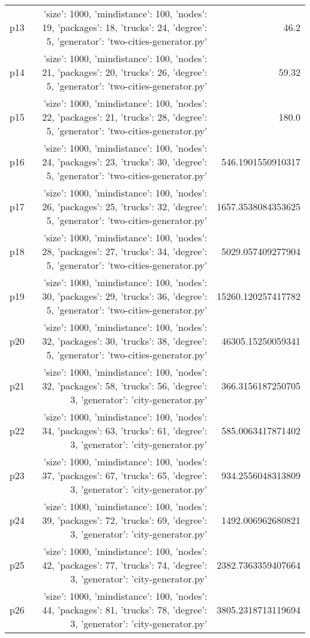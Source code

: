 \documentclass{article}
\begin{document}
\begin{center}
\begin{tabular}{r|r|r}
  p13&{'size': 1000, 'mindistance': 100, 'nodes': 19, 'packages': 18, 'trucks': 24, 'degree': 5, 'generator': 'two-cities-generator.py'}&46.2\\
  p14&{'size': 1000, 'mindistance': 100, 'nodes': 21, 'packages': 20, 'trucks': 26, 'degree': 5, 'generator': 'two-cities-generator.py'}&59.32\\
  p15&{'size': 1000, 'mindistance': 100, 'nodes': 22, 'packages': 21, 'trucks': 28, 'degree': 5, 'generator': 'two-cities-generator.py'}&180.0\\
  p16&{'size': 1000, 'mindistance': 100, 'nodes': 24, 'packages': 23, 'trucks': 30, 'degree': 5, 'generator': 'two-cities-generator.py'}&546.1901550910317\\
  p17&{'size': 1000, 'mindistance': 100, 'nodes': 26, 'packages': 25, 'trucks': 32, 'degree': 5, 'generator': 'two-cities-generator.py'}&1657.3538084353625\\
  p18&{'size': 1000, 'mindistance': 100, 'nodes': 28, 'packages': 27, 'trucks': 34, 'degree': 5, 'generator': 'two-cities-generator.py'}&5029.057409277904\\
  p19&{'size': 1000, 'mindistance': 100, 'nodes': 30, 'packages': 29, 'trucks': 36, 'degree': 5, 'generator': 'two-cities-generator.py'}&15260.120257417782\\
  p20&{'size': 1000, 'mindistance': 100, 'nodes': 32, 'packages': 30, 'trucks': 38, 'degree': 5, 'generator': 'two-cities-generator.py'}&46305.15250059341\\
  p21&{'size': 1000, 'mindistance': 100, 'nodes': 32, 'packages': 58, 'trucks': 56, 'degree': 3, 'generator': 'city-generator.py'}&366.3156187250705\\
  p22&{'size': 1000, 'mindistance': 100, 'nodes': 34, 'packages': 63, 'trucks': 61, 'degree': 3, 'generator': 'city-generator.py'}&585.0063417871402\\
  p23&{'size': 1000, 'mindistance': 100, 'nodes': 37, 'packages': 67, 'trucks': 65, 'degree': 3, 'generator': 'city-generator.py'}&934.2556048313809\\
  p24&{'size': 1000, 'mindistance': 100, 'nodes': 39, 'packages': 72, 'trucks': 69, 'degree': 3, 'generator': 'city-generator.py'}&1492.006962680821\\
  p25&{'size': 1000, 'mindistance': 100, 'nodes': 42, 'packages': 77, 'trucks': 74, 'degree': 3, 'generator': 'city-generator.py'}&2382.7363359407664\\
  p26&{'size': 1000, 'mindistance': 100, 'nodes': 44, 'packages': 81, 'trucks': 78, 'degree': 3, 'generator': 'city-generator.py'}&3805.2318713119694\\

\end{tabular}
\end{center}
\end{document}
